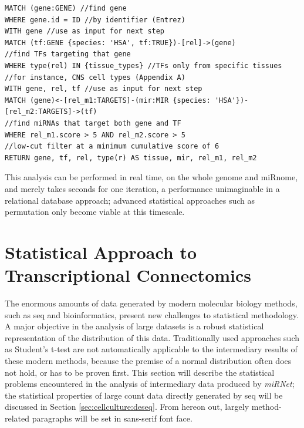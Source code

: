 \begin{lstlisting}[label=lst:loop,
caption=Feedforward Loop Identification,
language=Cypher]
MATCH (gene:GENE) //find gene
WHERE gene.id = ID //by identifier (Entrez)
WITH gene //use as input for next step
MATCH (tf:GENE {species: 'HSA', tf:TRUE})-[rel]->(gene) 
//find TFs targeting that gene
WHERE type(rel) IN {tissue_types} //TFs only from specific tissues
//for instance, CNS cell types (Appendix A)
WITH gene, rel, tf //use as input for next step
MATCH (gene)<-[rel_m1:TARGETS]-(mir:MIR {species: 'HSA'})-[rel_m2:TARGETS]->(tf) 
//find miRNAs that target both gene and TF
WHERE rel_m1.score > 5 AND rel_m2.score > 5 
//low-cut filter at a minimum cumulative score of 6
RETURN gene, tf, rel, type(r) AS tissue, mir, rel_m1, rel_m2
\end{lstlisting}

This analysis can be performed in real time, on the whole genome and miRnome, and merely takes seconds for one iteration, a performance unimaginable in a relational database approach; advanced statistical approaches such as permutation only become viable at this timescale.

\section{Statistical Approach to Transcriptional Connectomics}
The enormous amounts of data generated by modern molecular biology methods, such as \ac{seq} and bioinformatics, present new challenges to statistical methodology. A major objective in the analysis of large datasets is a robust statistical representation of the distribution of this data. Traditionally used approaches such as Student's t-test are not automatically applicable to the intermediary results of these modern methods, because the premise of a normal distribution often does not hold, or has to be proven first. This section will describe the statistical problems encountered in the analysis of intermediary data produced by \textit{miRNet}; the statistical properties of large count data directly generated by \ac{seq} will be discussed in Section \ref{sec:cellculture:deseq}. From hereon out, largely method-related paragraphs will be set in sans-serif font face.

